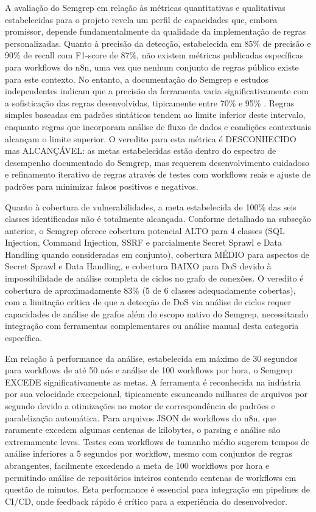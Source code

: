 \documentclass{sftex}
\begin{document}
A avaliação do Semgrep em relação às métricas quantitativas e qualitativas estabelecidas para o projeto revela um perfil de capacidades que, embora promissor, depende fundamentalmente da qualidade da implementação de regras personalizadas. Quanto à precisão da detecção, estabelecida em 85\% de precisão e 90\% de recall com F1-score de 87\%, não existem métricas publicadas específicas para workflows do n8n, uma vez que nenhum conjunto de regras público existe para este contexto. No entanto, a documentação do Semgrep e estudos independentes indicam que a precisão da ferramenta varia significativamente com a sofisticação das regras desenvolvidas, tipicamente entre 70\% e 95\% \cite{semgrep_platform}. Regras simples baseadas em padrões sintáticos tendem ao limite inferior deste intervalo, enquanto regras que incorporam análise de fluxo de dados e condições contextuais alcançam o limite superior. O veredito para esta métrica é DESCONHECIDO mas ALCANÇÁVEL: as metas estabelecidas estão dentro do espectro de desempenho documentado do Semgrep, mas requerem desenvolvimento cuidadoso e refinamento iterativo de regras através de testes com workflows reais e ajuste de padrões para minimizar falsos positivos e negativos.

Quanto à cobertura de vulnerabilidades, a meta estabelecida de 100\% das seis classes identificadas não é totalmente alcançada. Conforme detalhado na subseção anterior, o Semgrep oferece cobertura potencial ALTO para 4 classes (SQL Injection, Command Injection, SSRF e parcialmente Secret Sprawl e Data Handling quando consideradas em conjunto), cobertura MÉDIO para aspectos de Secret Sprawl e Data Handling, e cobertura BAIXO para DoS devido à impossibilidade de análise completa de ciclos no grafo de conexões. O veredito é cobertura de aproximadamente 83\% (5 de 6 classes adequadamente cobertas), com a limitação crítica de que a detecção de DoS via análise de ciclos requer capacidades de análise de grafos além do escopo nativo do Semgrep, necessitando integração com ferramentas complementares ou análise manual desta categoria específica.

Em relação à performance da análise, estabelecida em máximo de 30 segundos para workflows de até 50 nós e análise de 100 workflows por hora, o Semgrep EXCEDE significativamente as metas. A ferramenta é reconhecida na indústria por sua velocidade excepcional, tipicamente escaneando milhares de arquivos por segundo devido a otimizações no motor de correspondência de padrões e paralelização automática. Para arquivos JSON de workflows do n8n, que raramente excedem algumas centenas de kilobytes, o parsing e análise são extremamente leves. Testes com workflows de tamanho médio sugerem tempos de análise inferiores a 5 segundos por workflow, mesmo com conjuntos de regras abrangentes, facilmente excedendo a meta de 100 workflows por hora e permitindo análise de repositórios inteiros contendo centenas de workflows em questão de minutos. Esta performance é essencial para integração em pipelines de CI/CD, onde feedback rápido é crítico para a experiência do desenvolvedor.
\end{document}
